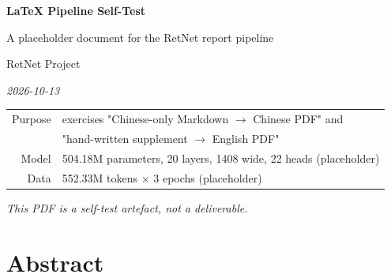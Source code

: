 \documentclass[11pt,openany]{article}
\begin{document}
\thispagestyle{empty}

\begin{center}
\vspace*{3.2cm}

{\LARGE\bfseries LaTeX Pipeline Self-Test}

\vspace{0.55cm}

{\large A placeholder document for the RetNet report pipeline}

\vspace{1.1cm}

{\normalsize RetNet Project}

\vspace{0.25cm}

{\small\itshape 2026-10-13}

\vspace{2.2cm}

\begin{minipage}{0.80\textwidth}
\centering\small
\begin{tabular}{@{}rl@{}}
\toprule
Purpose & exercises "Chinese-only Markdown $\rightarrow$ Chinese PDF" and \\
        & "hand-written supplement $\rightarrow$ English PDF" \\
Model & 504.18M parameters, 20 layers, 1408 wide, 22 heads (placeholder) \\
Data & 552.33M tokens $\times$ 3 epochs (placeholder) \\
\bottomrule
\end{tabular}
\end{minipage}

\vfill

{\small\itshape This PDF is a self-test artefact, not a deliverable.}

\vspace{1.2cm}
\end{center}

\clearpage

\section*{Abstract}
\end{document}

